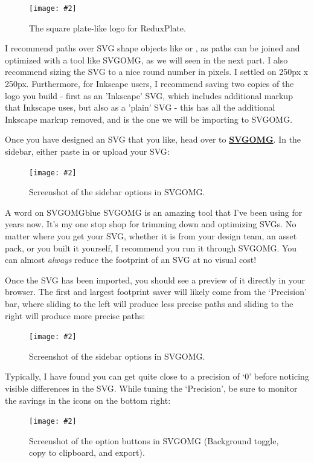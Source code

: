 \documentclass[a4paper,headinclude=on,footinclude=on,12pt,oneside]{scrbook}
\newcommand{\link}[2]{\textbf{\textcolor{monokaiPink}{\href{#2}{#1}}}}
\newcommand{\standardfigure}[3]{\begin{figure}[H]\begin{center}\texttt{[image: \#2]}\caption{#3}\label{fig:#2}\end{center}\end{figure}}
\begin{document}
\standardfigure{\textwidth/2}{frontend/logo-design/logo}{The square plate-like logo for ReduxPlate.}

I recommend paths over SVG shape objects like  or , as paths can be joined and optimized with a tool like SVGOMG, as we will seen in the next part. I also recommend sizing the SVG to a nice round number in pixels. I settled on 250px x 250px. Furthermore, for Inkscape users, I recommend saving two copies of the logo you build - first as an 'Inkscape' SVG, which includes additional markup that Inkscape uses, but also as a 'plain' SVG - this has all the additional Inkscape markup removed, and is the one we will be importing to SVGOMG.


Once you have designed an SVG that you like, head over to \link{SVGOMG}{https://jakearchibald.github.io/svgomg/}. In the sidebar, either paste in or upload your SVG:

\standardfigure{\textwidth}{frontend/logo-design/svgomg-sidebar}{Screenshot of the sidebar options in SVGOMG.}

\begin{highlightBox}{A word on SVGOMG}{blue}{\information}
SVGOMG is an amazing tool that I've been using for years now. It's my one stop shop for trimming down and optimizing SVGs. No matter where you get your SVG, whether it is from your design team, an asset pack, or you built it yourself, I recommend you run it through SVGOMG. You can almost \textit{always} reduce the footprint of an SVG at no visual cost!
\end{highlightBox}

Once the SVG has been imported, you should see a preview of it directly in your browser. The first and largest footprint saver will likely come from the `Precision' bar, where sliding to the left will produce less precise paths and sliding to the right will produce more precise paths:

\standardfigure{\textwidth}{frontend/logo-design/svgomg-precision-bar}{Screenshot of the sidebar options in SVGOMG.}

Typically, I have found you can get quite close to a precision of `0' before noticing visible differences in the SVG. While tuning the `Precision', be sure to monitor the savings in the icons on the bottom right:

\standardfigure{\textwidth}{frontend/logo-design/svgomg-icons}{Screenshot of the option buttons in SVGOMG (Background toggle, copy to clipboard, and export).}
\end{document}
